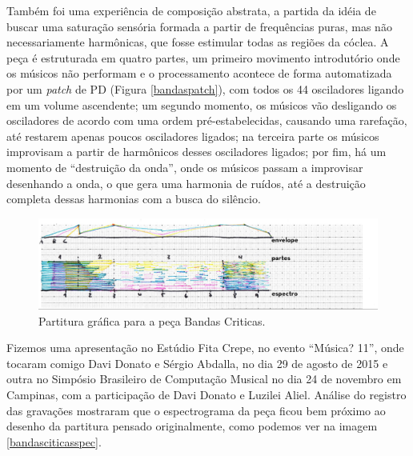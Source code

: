 Também foi uma experiência de composição abstrata, a partida da idéia de buscar uma saturação sensória formada a partir de frequências puras, mas não necessariamente harmônicas, que fosse estimular todas as regiões da cóclea. A peça é estruturada em quatro partes, um primeiro movimento introdutório onde os músicos não performam e o processamento acontece de forma automatizada por um \emph{patch} de PD (Figura \ref{bandaspatch}), com todos os 44 osciladores ligando em um volume ascendente; um segundo momento, os músicos vão desligando os osciladores de acordo com uma ordem pré-estabelecidas, causando uma rarefação, até restarem apenas poucos osciladores ligados; na terceira parte os músicos improvisam a partir de harmônicos desses osciladores ligados; por fim, há um momento de ``destruição da onda'', onde os músicos passam a improvisar desenhando a onda, o que gera uma harmonia de ruídos, até a destruição completa dessas harmonias com a busca do silêncio.

\begin{figure}[htb]
    \caption{\label{bandaspartitura}Partitura gráfica para a peça Bandas Criticas. }
    \begin{center}
    \includegraphics[width=1\linewidth]{pictures/cap3/bandascriticaspartitura}
    \end{center}
\end{figure}

Fizemos uma apresentação no Estúdio Fita Crepe, no evento ``Música? 11'', onde tocaram comigo Davi Donato e Sérgio Abdalla, no dia 29 de agosto de 2015 e outra no Simpósio Brasileiro de Computação Musical no dia 24 de novembro em Campinas, com a participação de Davi Donato e Luzilei Aliel. Análise do registro das gravações mostraram que o espectrograma da peça ficou bem próximo ao desenho da partitura pensado originalmente, como podemos ver na imagem \ref{bandasciticasspec}. 

